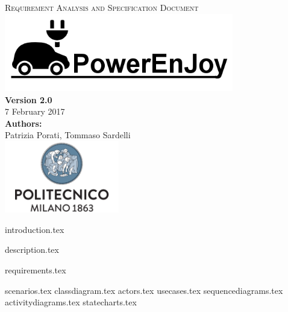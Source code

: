 \documentclass[a4paper,11pt]{article}
\begin{document}
\begin{titlepage}
\begin{center}
\textsc{\LARGE Requirement Analysis and Specification Document}\\[1.5cm] %

\includegraphics[width=10cm]{PowerEnJoy.png}\\

\vfill
\vfill
\textbf{Version 2.0}\\
7 February 2017\\[0.5cm]
\textbf{Authors:}\\
Patrizia Porati, Tommaso Sardelli\\[2.0cm] 


\vfill
\vfill
\includegraphics[width=50mm]{polimi.png}\\
\end{center}
\end{titlepage}

\tableofcontents
\pagebreak

{introduction.tex}

{description.tex}

{requirements.tex}

{scenarios.tex}
{classdiagram.tex}
{actors.tex}
{usecases.tex}
{sequencediagrams.tex}
{activitydiagrams.tex}
{statecharts.tex}
\end{document}
